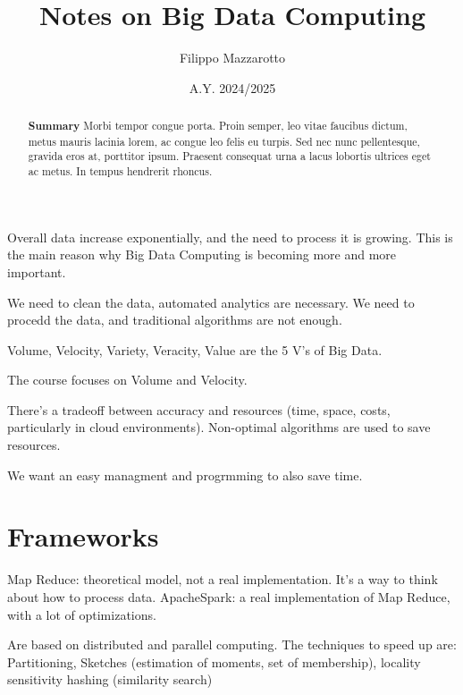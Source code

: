 \documentclass[a4paper]{tufte-handout} %
\title{Notes on Big Data Computing}
\author{Filippo Mazzarotto}
\date{A.Y. 2024/2025}
\begin{document}
\maketitle %


\begin{abstract}
	\textbf{Summary}
	Morbi tempor congue porta. Proin semper, leo vitae faucibus dictum, metus mauris lacinia lorem, ac congue leo felis eu turpis. Sed nec nunc pellentesque, gravida eros at, porttitor ipsum. Praesent consequat urna a lacus lobortis ultrices eget ac metus. In tempus hendrerit rhoncus.
\end{abstract}


Overall data increase exponentially, and the need to process it is growing. This is the main reason why Big Data Computing is becoming more and more important.

We need to clean the data, automated analytics are necessary.
We need to procedd the data, and traditional algorithms are not enough.

Volume, Velocity, Variety, Veracity, Value are the 5 V's of Big Data.

The course focuses on Volume and Velocity.

There's a tradeoff between accuracy and resources (time, space, costs, particularly in cloud environments). Non-optimal algorithms are used to save resources.

We want an easy managment and progrmming to also save time.

\section{Frameworks}

Map Reduce: theoretical model, not a real implementation. It's a way to think about how to process data.
ApacheSpark: a real implementation of Map Reduce, with a lot of optimizations.

Are based on distributed and parallel computing. The techniques to speed up are:
Partitioning, Sketches (estimation of moments, set of membership), locality sensitivity hashing (similarity search)
\end{document}
